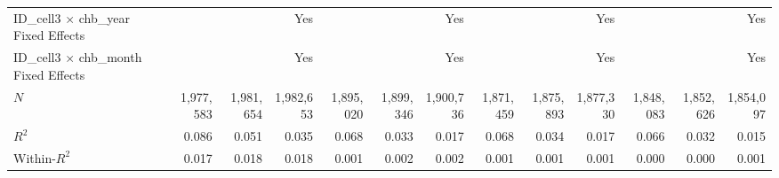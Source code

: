 \begin{tabular}{lrrrrrrrrrrrr}
ID\_cell3 $\times$ chb\_year Fixed Effects  &              &              &          Yes &              &              &          Yes &              &              &          Yes &              &              &          Yes \\ 
ID\_cell3 $\times$ chb\_month Fixed Effects &              &              &          Yes &              &              &          Yes &              &              &          Yes &              &              &          Yes \\ 
\midrule
$N$                                         &    1,977,583 &    1,981,654 &    1,982,653 &    1,895,020 &    1,899,346 &    1,900,736 &    1,871,459 &    1,875,893 &    1,877,330 &    1,848,083 &    1,852,626 &    1,854,097 \\ 
$R^2$                                       &        0.086 &        0.051 &        0.035 &        0.068 &        0.033 &        0.017 &        0.068 &        0.034 &        0.017 &        0.066 &        0.032 &        0.015 \\ 
Within-$R^2$                                &        0.017 &        0.018 &        0.018 &        0.001 &        0.002 &        0.002 &        0.001 &        0.001 &        0.001 &        0.000 &        0.000 &        0.001 \\ 
\bottomrule
\end{tabular}
